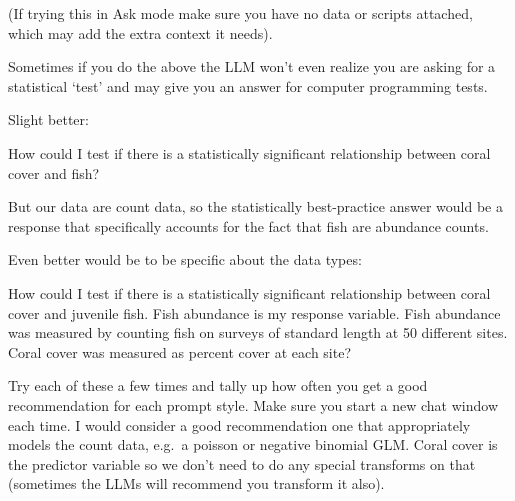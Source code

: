 \documentclass[
  letterpaper,
  DIV=11,
  numbers=noendperiod]{scrreprt}
\begin{document}
(If trying this in Ask mode make sure you have no data or scripts
attached, which may add the extra context it needs).

Sometimes if you do the above the LLM won't even realize you are asking
for a statistical `test' and may give you an answer for computer
programming tests.

Slight better:

\begin{tcolorbox}[enhanced jigsaw, coltitle=black, breakable, toptitle=1mm, titlerule=0mm, bottomtitle=1mm, colframe=quarto-callout-note-color-frame, left=2mm, leftrule=.75mm, title=\textcolor{quarto-callout-note-color}{\faInfo}\hspace{0.5em}{Note}, opacityback=0, colback=white, opacitybacktitle=0.6, bottomrule=.15mm, arc=.35mm, rightrule=.15mm, toprule=.15mm, colbacktitle=quarto-callout-note-color!10!white]

How could I test if there is a statistically significant relationship
between coral cover and fish?

\end{tcolorbox}

But our data are count data, so the statistically best-practice answer
would be a response that specifically accounts for the fact that fish
are abundance counts.

Even better would be to be specific about the data types:

\begin{tcolorbox}[enhanced jigsaw, coltitle=black, breakable, toptitle=1mm, titlerule=0mm, bottomtitle=1mm, colframe=quarto-callout-note-color-frame, left=2mm, leftrule=.75mm, title=\textcolor{quarto-callout-note-color}{\faInfo}\hspace{0.5em}{Note}, opacityback=0, colback=white, opacitybacktitle=0.6, bottomrule=.15mm, arc=.35mm, rightrule=.15mm, toprule=.15mm, colbacktitle=quarto-callout-note-color!10!white]

How could I test if there is a statistically significant relationship
between coral cover and juvenile fish. Fish abundance is my response
variable. Fish abundance was measured by counting fish on surveys of
standard length at 50 different sites. Coral cover was measured as
percent cover at each site?

\end{tcolorbox}

Try each of these a few times and tally up how often you get a good
recommendation for each prompt style. Make sure you start a new chat
window each time. I would consider a good recommendation one that
appropriately models the count data, e.g.~a poisson or negative binomial
GLM. Coral cover is the predictor variable so we don't need to do any
special transforms on that (sometimes the LLMs will recommend you
transform it also).
\end{document}
